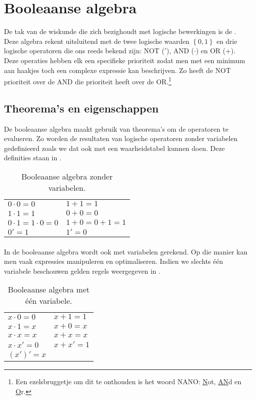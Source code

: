 \section{Booleaanse algebra}
De tak van de wiskunde die zich bezighoudt met logische bewerkingen is de . Deze algebra rekent uitsluitend met de twee logische waarden $\left\{0,1\right\}$ en drie logische operatoren die ons reeds bekend zijn: NOT ($'$), AND ($\cdot$) en OR ($+$). Deze operaties hebben elk een specifieke prioriteit zodat men met een minimum aan haakjes toch een complexe expressie kan beschrijven. Zo heeft de NOT prioriteit over de AND die prioriteit heeft over de OR.\footnote{Een ezelsbruggetje om dit te onthouden is het woord NANO: \underline{N}ot, \underline{AN}d en \underline{O}r.}

\subsection{Theorema's en eigenschappen}
De booleaanse algebra maakt gebruik van theorema's om de operatoren te evalueren. Zo worden de resultaten van logische operatoren zonder variabelen gedefinieerd zoals we dat ook met een waarheidstabel kunnen doen. Deze definities staan in .
\begin{table}[htb]
\centering
\begin{tabular}{ll}
$0\cdot0=0$&$1+1=1$\\
$1\cdot1=1$&$0+0=0$\\
$0\cdot1=1\cdot0=0$&$1+0=0+1=1$\\
$0'=1$&$1'=0$
\end{tabular}
\caption{Booleaanse algebra zonder variabelen.}
\end{table}

\paragraph{}
In de booleaanse algebra wordt ook met variabelen gerekend. Op die manier kan men vaak expressies manipuleren en optimaliseren. Indien we slechts \'e\'en variabele beschouwen gelden regels weergegeven in .
\begin{table}[htb]
\centering
\begin{tabular}{ll}
$x\cdot 0=0$&$x+1=1$\\
$x\cdot 1=x$&$x+0=x$\\
$x\cdot x=x$&$x+x=x$\\
$x\cdot x'=0$&$x+x'=1$\\
$(x')'=x$&\\
\end{tabular}
\caption{Booleaanse algebra met \'e\'en variabele.}
\end{table}

